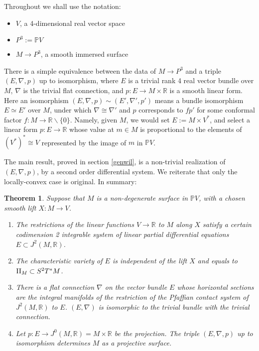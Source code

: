 \documentclass[11pt]{article}
\numberwithin{equation}{section}
\theoremstyle{plain}
\newtheorem*{theoremN}{Theorem}
\theoremstyle{remark}
\renewcommand{\P}{\mathbb{P}}
\newcommand{\R}{\mathbb{R}}
\newcommand{\II}{\textnormal{II}}
\begin{document}
Throughout we shall use the notation:
\begin{itemize}
\itemsep-0.3em
\item{$V$, a 4-dimensional real vector space}
\item{$P^{3}:=\P V$}
\item{$M \rightarrow P^{3}$, a smooth immersed surface}
\end{itemize}
There is a simple equivalence between the data of $M\rightarrow P^{3}$ and a triple $(E,\nabla,p)$ up to isomorphism, where $E$ is a trivial rank 4 real vector bundle over $M$, $\nabla$ is the trivial flat connection, and $p:E\rightarrow M\times \R$ is a smooth linear form. Here an isomorphism $(E,\nabla,p)\sim(E',\nabla',p')$ means a bundle isomorphism $E\simeq E'$ over $M$, under which $\nabla\cong \nabla'$ and $p$ corresponds to $fp'$ for some conformal factor $f:M\rightarrow \R\backslash\{0\}$. Namely, given $M$, we would set $E:=M\times V^*$, and select a linear form $p:E\rightarrow \R$ whose value at $m\in M$ is proportional to the elements of $(V^*)^*\cong V$ represented by the image of $m$ in $\P V$.

The main result, proved in section \ref{genwil}, is a non-trivial realization of $(E,\nabla,p)$, by a second order differential system. We reiterate that only the locally-convex case is original. In summary:

\begin{theoremN}
Suppose that $M$ is a non-degenerate surface in $\P V$, with a chosen smooth lift $X:M\rightarrow V$.
\begin{enumerate}\itemsep0em
\item{
The restrictions of the linear functions $V\rightarrow \R$ to $M$ along $X$ satisfy a certain codimension 2 integrable system of linear partial differential equations $E \subset J^{2}(M,\R)$.
}
\item{
The characteristic variety of $E$ is independent of the lift $X$ and equals to $\II_M\subset S^{2}T^*M$.
}
\item{
There is a flat connection $\nabla$ on the vector bundle $E$ whose horizontal sections are the integral manifolds of the restriction of the Pfaffian contact system of $J^{2}(M,\R)$ to $E$. $(E,\nabla)$ is isomorphic to the trivial bundle with the trivial connection.
}
\item{Let $p:E\rightarrow J^{0}(M,\R)=M\times \R$ be the projection. The triple $(E,\nabla,p)$ up to isomorphism determines $M$ as a projective surface.
}
\end{enumerate}
\end{theoremN}
\end{document}
